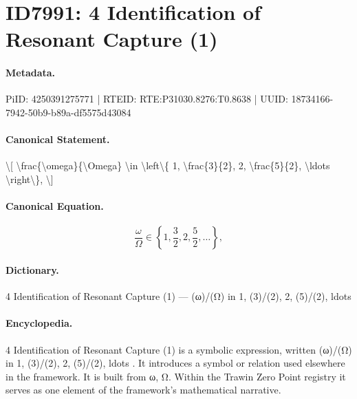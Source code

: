 \section*{ID7991: 4 Identification of Resonant Capture (1)}
\paragraph{Metadata.}
PiID: 4250391275771 | RTEID: RTE:P31030.8276:T0.8638 | UUID: 18734166-7942-50b9-b89a-df5575d43084

\paragraph{Canonical Statement.}
\textbackslash{}[ \textbackslash{}frac\{\textbackslash{}omega\}\{\textbackslash{}Omega\} \textbackslash{}in \textbackslash{}left\textbackslash{}\{ 1, \textbackslash{}frac\{3\}\{2\}, 2, \textbackslash{}frac\{5\}\{2\}, \textbackslash{}ldots \textbackslash{}right\textbackslash{}\}, \textbackslash{}]

\paragraph{Canonical Equation.}
\[
\frac{\omega}{\Omega} \in \left\{ 1, \frac{3}{2}, 2, \frac{5}{2}, \ldots \right\},
\]

\paragraph{Dictionary.}
4 Identification of Resonant Capture (1) — (ω)/(Ω) in 1, (3)/(2), 2, (5)/(2), ldots

\paragraph{Encyclopedia.}
4 Identification of Resonant Capture (1) is a symbolic expression, written (ω)/(Ω) in 1, (3)/(2), 2, (5)/(2), ldots . It introduces a symbol or relation used elsewhere in the framework. It is built from ω, Ω. Within the Trawin Zero Point registry it serves as one element of the framework's mathematical narrative.
